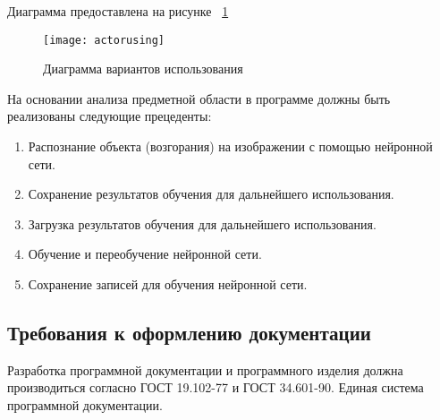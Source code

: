 Диаграмма предоставлена на рисунке ~\ref{actorusing:image}

\begin{figure}[H]
\texttt{[image: actorusing]}
\caption{Диаграмма вариантов использования}
\label{actorusing:image}
\end{figure}

На основании анализа предметной области в программе должны быть реализованы следующие прецеденты: 
\begin{enumerate}
	\item Распознание объекта (возгорания) на изображении с помощью нейронной сети.
	\item Сохранение результатов обучения для дальнейшего использования.
	\item Загрузка результатов обучения для дальнейшего использования.
	\item Обучение и переобучение нейронной сети.
	\item Сохранение записей для обучения нейронной сети.
\end{enumerate}

\subsection{Требования к оформлению документации}

Разработка программной документации и программного изделия должна производиться согласно ГОСТ 19.102-77 и ГОСТ 34.601-90. Единая система программной документации.

